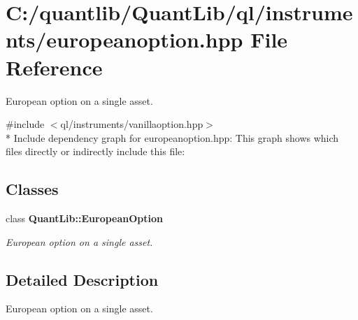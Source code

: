 \section{C\+:/quantlib/\+Quant\+Lib/ql/instruments/europeanoption.hpp File Reference}
\label{europeanoption_8hpp}


European option on a single asset.  


{\ttfamily \#include $<$ql/instruments/vanillaoption.\+hpp$>$}\\*
Include dependency graph for europeanoption.\+hpp\+:
This graph shows which files directly or indirectly include this file\+:
\subsection*{Classes}
\begin{DoxyCompactItemize}
\item 
class {\bf Quant\+Lib\+::\+European\+Option}
\begin{DoxyCompactList}\small\item\em European option on a single asset. \end{DoxyCompactList}\end{DoxyCompactItemize}


\subsection{Detailed Description}
European option on a single asset. 

